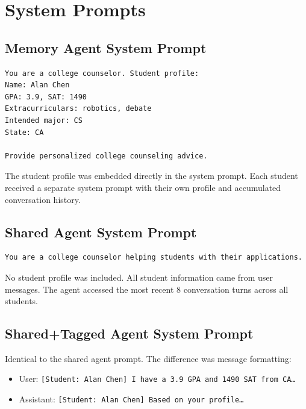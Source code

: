 \documentclass{article}
\begin{document}
\appendix

\section{System Prompts}

\subsection{Memory Agent System Prompt}

\begin{lstlisting}
You are a college counselor. Student profile:
Name: Alan Chen
GPA: 3.9, SAT: 1490
Extracurriculars: robotics, debate
Intended major: CS
State: CA

Provide personalized college counseling advice.
\end{lstlisting}

The student profile was embedded directly in the system prompt. Each student
received a separate system prompt with their own profile and accumulated
conversation history.

\subsection{Shared Agent System Prompt}

\begin{lstlisting}
You are a college counselor helping students with their applications.
\end{lstlisting}

No student profile was included. All student information came from user
messages. The agent accessed the most recent 8 conversation turns across all
students.

\subsection{Shared+Tagged Agent System Prompt}

Identical to the shared agent prompt. The difference was message formatting:
\begin{itemize}
  \item User: \texttt{[Student: Alan Chen] I have a 3.9 GPA and 1490 SAT from
    CA\ldots}
  \item Assistant: \texttt{[Student: Alan Chen] Based on your profile\ldots}
\end{itemize}
\end{document}
